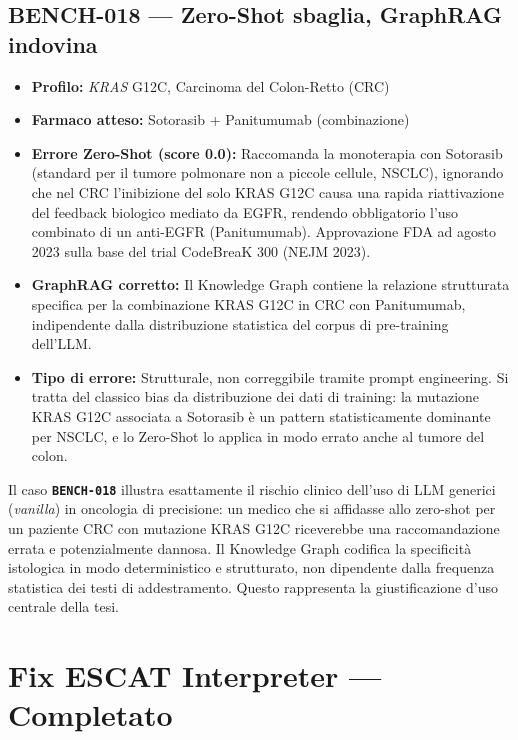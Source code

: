 \documentclass[12pt, a4paper]{article}
\newcommand{\bench}[1]{{\texttt{\textbf{#1}}}}
\begin{document}
\subsection*{BENCH-018 --- Zero-Shot sbaglia, GraphRAG indovina}
\begin{itemize}[leftmargin=1.5em, itemsep=2pt]
  \item \textbf{Profilo:} \textit{KRAS} G12C, Carcinoma del Colon-Retto (CRC)
  \item \textbf{Farmaco atteso:} Sotorasib + Panitumumab (combinazione)
  \item \textbf{Errore Zero-Shot (score 0.0):} Raccomanda la monoterapia con Sotorasib (standard per il tumore polmonare non a piccole cellule, NSCLC), ignorando che nel CRC l'inibizione del solo KRAS G12C causa una rapida riattivazione del feedback biologico mediato da EGFR, rendendo obbligatorio l'uso combinato di un anti-EGFR (Panitumumab). Approvazione FDA ad agosto 2023 sulla base del trial CodeBreaK 300 (NEJM 2023).
  \item \textbf{GraphRAG corretto:} Il Knowledge Graph contiene la relazione strutturata specifica per la combinazione KRAS G12C in CRC con Panitumumab, indipendente dalla distribuzione statistica del corpus di pre-training dell'LLM.
  \item \textbf{Tipo di errore:} Strutturale, non correggibile tramite prompt engineering. Si tratta del classico bias da distribuzione dei dati di training: la mutazione KRAS G12C associata a Sotorasib è un pattern statisticamente dominante per NSCLC, e lo Zero-Shot lo applica in modo errato anche al tumore del colon.
\end{itemize}

\begin{insightbox}
Il caso \bench{BENCH-018} illustra esattamente il rischio clinico dell'uso di LLM generici (\textit{vanilla}) in oncologia di precisione: un medico che si affidasse allo zero-shot per un paziente CRC con mutazione KRAS G12C riceverebbe una raccomandazione errata e potenzialmente dannosa. Il Knowledge Graph codifica la specificità istologica in modo deterministico e strutturato, non dipendente dalla frequenza statistica dei testi di addestramento. Questo rappresenta la giustificazione d'uso centrale della tesi.
\end{insightbox}

\section{Fix ESCAT Interpreter --- Completato}
\end{document}
